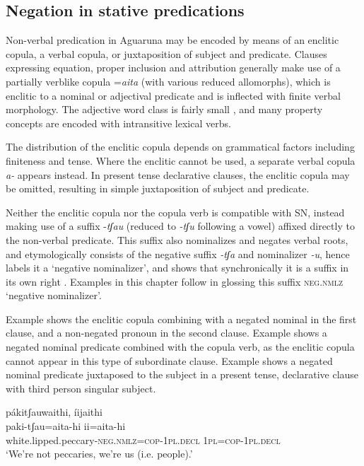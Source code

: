 \documentclass[output=paper,colorlinks,citecolor=brown,draft]{langscibook}
\begin{document}
\subsection{Negation in stative predications}\label{sec:agu:2.3}

Non-verbal predication in Aguaruna may be encoded by means of an enclitic copula, a verbal copula, or juxtaposition of subject and predicate. Clauses expressing equation, proper inclusion and attribution generally make use of a partially verblike copula =\textit{aita} (with various reduced allomorphs), which is enclitic to a nominal or adjectival predicate and is inflected with finite verbal morphology. The adjective word class is fairly small \citep[130]{Overall2017a}, and many property concepts are encoded with intransitive lexical verbs. 

The distribution of the enclitic copula depends on grammatical factors including finiteness and tense. Where the enclitic cannot be used, a separate verbal copula \textit{a-} appears instead. In present tense declarative clauses, the enclitic copula may be omitted, resulting in simple juxtaposition of subject and predicate.

Neither the enclitic copula nor the copula verb is compatible with SN, instead making use of a suffix \nobreakdash-\textit{tʃau} (reduced to \textit{{}-tʃu} following a vowel) affixed directly to the non-verbal predicate. This suffix also nominalizes and negates verbal roots, and etymologically consists of the negative suffix \textit{{}-tʃa} and nominalizer \textit{\nobreakdash-u}, hence \citet{Overall2017a} labels it a ‘negative nominalizer’, and shows that synchronically it is a suffix in its own right \citep[513–514, 527]{Overall2017a}. Examples in this chapter follow \citet{Overall2017a} in glossing this suffix \textsc{neg.nmlz} ‘negative nominalizer’.

Example  shows the enclitic copula combining with a negated nominal in the first clause, and a non-negated pronoun in the second clause. Example  shows a negated nominal predicate combined with the copula verb, as the enclitic copula cannot appear in this type of subordinate clause. Example  shows a negated nominal predicate juxtaposed to the subject in a present tense, declarative clause with third person singular subject.

\ea\label{ex:agu:20}
    \glll pákitʃauwaithi, íijaithi \\ 
          paki-tʃau=aita-hi  ii=aita-hi\\
          white.lipped.peccary-\textsc{neg.nmlz=cop-1pl.decl}  \textsc{1pl=cop-1pl.decl}  \\
    \glt ‘We’re not peccaries, we’re us (i.e. people).’ \citep[406]{Overall2017a}
\z           
\end{document}
